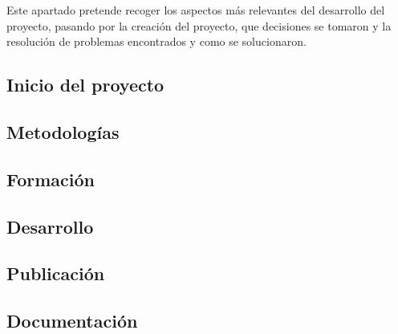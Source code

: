 
Este apartado pretende recoger los aspectos más relevantes del desarrollo del proyecto, pasando por la creación del proyecto, que decisiones se tomaron y la resolución de 
problemas encontrados y como se solucionaron.

\subsection{Inicio del proyecto}
\subsection{Metodologías}
\subsection{Formación}
\subsection{Desarrollo}
\subsection{Publicación}
\subsection{Documentación}


